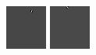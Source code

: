 \begin{figure}[ht]
\begin{center}
  \includegraphics[width=\columnwidth/11]{ch5/figures/mutinf_05.png}
  \includegraphics[width=\columnwidth/11]{ch5/figures/mutinf_06.png}

\end{center}
\end{figure}
